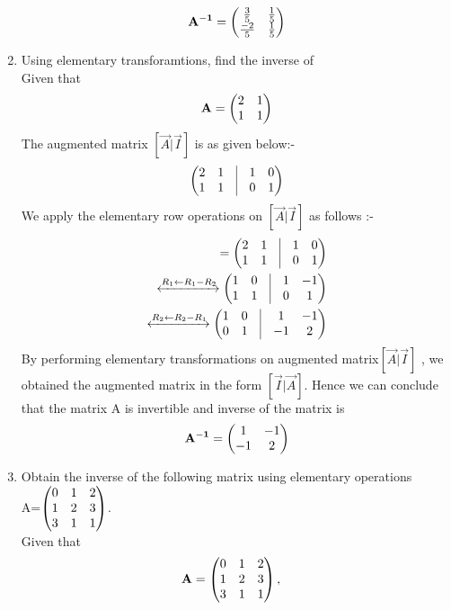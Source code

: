 \documentclass[journal,12pt,twocolumn]{IEEEtran}
\renewcommand\thesection{\arabic{section}}
\begin{document}
\begin{enumerate}[label=\thesection.\arabic*.,ref=\thesection.\theenumi]
\begin{align}
   \mathbf{A^{-1}}=\begin{pmatrix} \frac{3}{5} & \frac{1}{5}  \\  \frac{-2}{5} & \frac{1}{5}\end{pmatrix} 
    \end{align}
\item Using elementary transforamtions, find the inverse of   
   \\
  \solution
%  
Given that
\begin{align}
\mathbf{A} = \begin{pmatrix} 2 & 1 \\ 1 & 1\end{pmatrix}
\end{align}
The augmented matrix $ [\vec{A} | \vec{I}]$ is as given below:- 
\begin{align}
\myvec{2 & 1 & \vrule & 1 & 0 \\ 1 & 1 & \vrule & 0 & 1}
\end{align}
We apply the elementary row operations on $ [\vec{A} | \vec{I}]$ as follows :-
\begin{align}
[\vec{A} | \vec{I}] = \myvec{2 & 1 & \vrule & 1 & 0 \\ 1 & 1 & \vrule & 0 & 1}
\\
\xleftrightarrow{R_1\leftarrow R_1-R_2}   
\myvec{1 & 0 & \vrule & 1 & -1 \\ 1 & 1 & \vrule & 0 & 1}
\\
\xleftrightarrow{R_2\leftarrow R_2-R_1}
\myvec{1 & 0 & \vrule & 1 & -1 \\ 0 & 1 & \vrule & -1 & 2}
\end{align}
By performing elementary transformations on augmented matrix$ [\vec{A} | \vec{I}]$ , we obtained the augmented matrix in the form $ [\vec{I} | \vec{A}]$. 
Hence we can conclude that the matrix A is invertible and inverse of the matrix is
\begin{align}
\mathbf{A^{-1}}=\begin{pmatrix} 1 & -1 \\  -1 & 2\end{pmatrix} 
\end{align}
\item Obtain the inverse of the following matrix using elementary operations\\
  A=$\begin{pmatrix} 0 &1 &2\\1 &2 &3\\3 &1 &1\end{pmatrix}$.\\
  \solution
    Given that
    \begin{align}
    \mathbf{A}& =\begin{pmatrix} 0 & 1 & 2\\1 & 2 & 3\\3 & 1 & 1\end{pmatrix},
    \end{align}

\end{enumerate}
\end{document}
